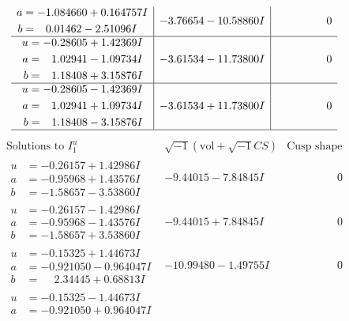 \documentclass[1p]{elsarticle_modified}
\theoremstyle{definition}
\newcommand{\I}{\sqrt{-1}}
\begin{document}
$$\begin{array}{c|c|c}
\begin{aligned}
a &= -1.084660 + 0.164757 I \\
b &= \phantom{-}0.01462 - 2.51096 I\end{aligned}
 & -3.76654 - 10.58860 I & \phantom{-0.000000 } 0 \\ \hline\begin{aligned}
u &= -0.28605 + 1.42369 I \\
a &= \phantom{-}1.02941 - 1.09734 I \\
b &= \phantom{-}1.18408 + 3.15876 I\end{aligned}
 & -3.61534 - 11.73800 I & \phantom{-0.000000 } 0 \\ \hline\begin{aligned}
u &= -0.28605 - 1.42369 I \\
a &= \phantom{-}1.02941 + 1.09734 I \\
b &= \phantom{-}1.18408 - 3.15876 I\end{aligned}
 & -3.61534 + 11.73800 I & \phantom{-0.000000 } 0\\
 \hline 
 \end{array}$$\newpage$$\begin{array}{c|c|c}  
\text{Solutions to }I^u_{1}& \I (\text{vol} + \sqrt{-1}CS) & \text{Cusp shape}\\
 \hline 
\begin{aligned}
u &= -0.26157 + 1.42986 I \\
a &= -0.95968 + 1.43576 I \\
b &= -1.58657 - 3.53860 I\end{aligned}
 & -9.44015 - 7.84845 I & \phantom{-0.000000 } 0 \\ \hline\begin{aligned}
u &= -0.26157 - 1.42986 I \\
a &= -0.95968 - 1.43576 I \\
b &= -1.58657 + 3.53860 I\end{aligned}
 & -9.44015 + 7.84845 I & \phantom{-0.000000 } 0 \\ \hline\begin{aligned}
u &= -0.15325 + 1.44673 I \\
a &= -0.921050 - 0.964047 I \\
b &= \phantom{-}2.34445 + 0.68813 I\end{aligned}
 & -10.99480 - 1.49755 I & \phantom{-0.000000 } 0 \\ \hline\begin{aligned}
u &= -0.15325 - 1.44673 I \\
a &= -0.921050 + 0.964047 I \\

\end{aligned}
\end{array}$$
\end{document}
